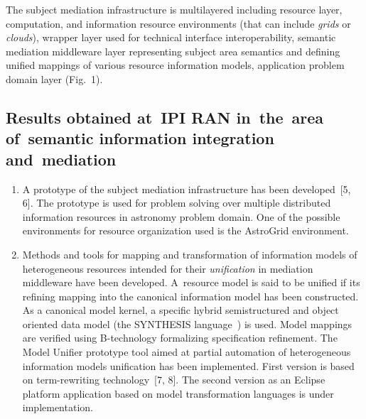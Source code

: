 \begin{multicols}{2}
\noindent
The subject mediation infrastructure is multilayered including resource layer, computation, and 
information resource environments (that can include \textit{grids} or \textit{clouds}), wrapper 
layer used for technical interface interoperability, semantic mediation middleware layer 
representing subject area semantics and defining unified mappings of various resource information 
models, application problem domain layer (Fig.~1). 


\subsection{Results obtained at~IPI RAN in~the~area of~semantic information 
integration and~mediation}

\noindent
\begin{enumerate}[1.]
\item A prototype of the subject mediation infrastructure has been developed~[5, 6]. The 
prototype is used for problem solving over multiple distributed information resources in 
astronomy problem domain. One of the possible environments for resource organization used is the 
AstroGrid environment.\\[-9pt]
\item Methods and tools for mapping and transformation of information models of 
heterogeneous resources intended for their \textit{unification} in mediation middleware have 
been developed. A~resource model is said to be unified if its refining mapping into the canonical 
information model has been constructed. As a canonical model kernel, a specific hybrid 
semistructured and object oriented data model (the SYNTHESIS language~\cite{2kal}) is used. 
Model mappings are verified using B-technology formalizing specification refinement. The 
Model Unifier prototype tool aimed at partial automation of heterogeneous information models 
unification has been implemented. First version is based on term-rewriting technology~[7, 8]. 
The second version as an Eclipse platform application based on model transformation 
languages is under implementation.
\end{enumerate}

\end{multicols}

\begin{figure}[h] %
\vspace*{1pt}
 \begin{center}
 \mbox{%
 \epsfxsize=160.657mm
 }
 \end{center}
 \vspace*{-9pt}
\vspace*{6pt}
\end{figure}



